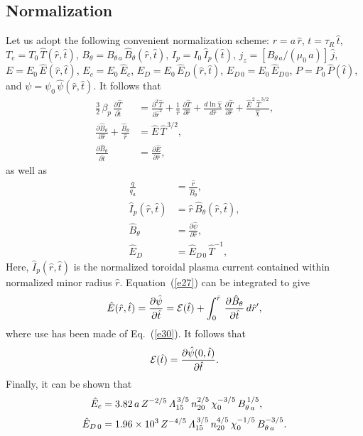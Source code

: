 \documentclass{iopjournal}
\begin{document}
\subsection{Normalization}
 Let us adopt the following convenient normalization scheme: $r=a\,\hat{r}$, $t=\tau_R\,\hat{t}$, $T_e=T_0\,\hat{T}(\hat{r},\hat{t})$, $B_\theta=B_{\theta\,a}\,\hat{B}_\theta(\hat{r},\hat{t})$,
 $I_p=I_0\,\hat{I}_p(\hat{t})$, $j_z=[B_{\theta\,a}/(\mu_0\,a)]\,\hat{j}$, $E=E_0\,\hat{E}(\hat{r},\hat{t})$, $E_c= E_0\,\hat{E}_c$, $E_D= E_0\,\hat{E}_D(\hat{r},\hat{t})$, $E_{D\,0}=E_0\,\hat{E}_{D\,0}$, $P= P_0\,\hat{P}(\hat{t})$,  and
 $\psi=\psi_0\,\hat{\psi}(\hat{r},\hat{t})$. It follows that 
 \begin{align}\label{e25}
\frac{3}{2}\,\beta_p\,\frac{\partial \hat{T}}{\partial\hat{t}}&=
 \frac{\partial^2\hat{T}}{\partial \hat{r}^2} 
 +\frac{1}{\hat{r}}\,\frac{\partial\hat{T}}{\partial\hat{r}} + \frac{d\ln\hat{\chi}}{d\hat{r}}\,\frac{\partial\hat{T}}{\partial\hat{r}}
 + \frac{\hat{E}^{\,2}\,\hat{T}^{\,3/2}}{\hat{\chi}},\\[0.5ex]
\frac{\partial\hat{B}_\theta}{\partial \hat{r}} + \frac{\hat{B}_\theta}{\hat{r}}&= \hat{E}\,\hat{T}^{\,3/2},\\[0.5ex]
\frac{\partial\hat{B}_\theta}{\partial\hat{t}}&= \frac{\partial\hat{E}}{\partial\hat{r}},\label{e27}
 \end{align}
 as well as
 \begin{align}
 \frac{q}{q_a}&= \frac{\hat{r}}{\hat{B}_\theta},\label{e28}\\[0.5ex]
 \hat{I}_p(\hat{r},\hat{t})&= \hat{r}\,\hat{B}_\theta(\hat{r},\hat{t}),\label{e29}\\[0.5ex]
 \hat{B}_\theta &=\frac{\partial\hat{\psi}}{\partial\hat{r}},\label{e30}\\[0.5ex]
 \hat{E}_D&= \hat{E}_{D\,0}\,\hat{T}^{-1},
 \end{align}
 Here, $\hat{I}_p(\hat{r},\hat{t})$ is the normalized toroidal plasma current contained within normalized minor radius $\hat{r}$. 
 Equation~(\ref{e27}) can be integrated to give
 \begin{equation}\label{e31}
 \hat{E}(\hat{r},\hat{t})= \frac{\partial\hat{\psi}}{\partial \hat{t}}={\cal E}(\hat{t})+\int_0^{\hat{r}}\,\frac{\partial\hat{B}_\theta}{\partial\hat{t}}\,d\hat{r}',
 \end{equation}
 where use has been made of Eq.~(\ref{e30}). It follows that 
 \begin{equation}
 {\cal E}(\hat{t}) = \frac{\partial\hat{\psi}(0,\hat{t})}{\partial\hat{t}}.
 \end{equation}
 Finally, it can be shown that
 \begin{align}
 \hat{E}_c&= 3.82\,a\,Z^{-2/5}\,{\mit\Lambda}_{15}^{\,3/5}\,n_{20}^{2/5}\,\chi_0^{-3/5}\,B_{\theta\,a}^{\,1/5},\\[0.5ex]
 \hat{E}_{D\,0} &= 1.96\times 10^3\,Z^{-4/5}\,{\mit\Lambda}_{15}^{\,3/5}\,n_{20}^{4/5}\,\chi_0^{-1/5}\,B_{\theta\,a}^{-3/5}.
 \end{align}
\end{document}
